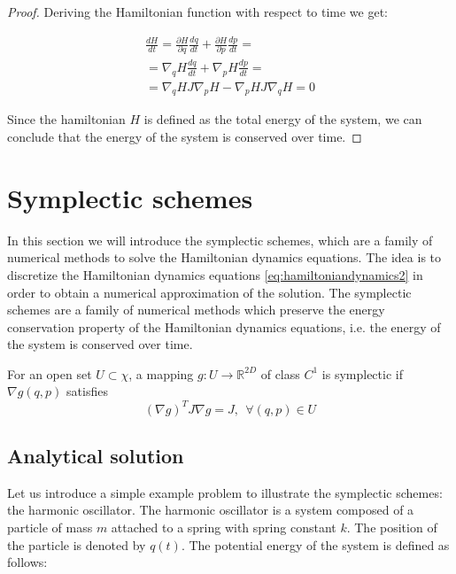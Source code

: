 \documentclass{report}
\begin{document}
\begin{proof}
	Deriving the Hamiltonian function with respect to time we get:

	\begin{gather*}
		\frac{dH}{dt} = \frac{\partial H}{\partial q} \frac{dq}{dt} + \frac{\partial H}{\partial p} \frac{dp}{dt} = \\ 
		= \nabla_q H \frac{dq}{dt} + \nabla_p H \frac{dp}{dt} = \\ 
		= \nabla_q H J \nabla_p H - \nabla_p H J \nabla_q H = 0
	\end{gather*}

	Since the hamiltonian \(H\) is defined as the total energy of the system, we can conclude that the energy of the system is conserved over time.
\end{proof}

\section{Symplectic schemes}
\label{sec:symplectic_schemes}

In this section we will introduce the symplectic schemes, which are a family of numerical methods to solve the Hamiltonian dynamics equations. The idea is to discretize the Hamiltonian dynamics equations \eqref{eq:hamiltoniandynamics2} in order to obtain a numerical approximation of the solution. The symplectic schemes are a family of numerical methods which preserve the energy conservation property of the Hamiltonian dynamics equations, i.e. the energy of the system is conserved over time.

\begin{definition}
	For an open set \(U \subset \chi \), a mapping \(g: U \rightarrow \mathbb{R}^{2D}\) of class \(C^1\) is symplectic if \(\nabla g(q,p)\) satisfies
	\[
		(\nabla g)^T J \nabla g = J, \ \ \forall (q,p) \in U
	\]
\end{definition}

\subsection{Analytical solution}
\label{sec:analytical_solution}

Let us introduce a simple example problem to illustrate the symplectic schemes: the harmonic oscillator. The harmonic oscillator is a system composed of a particle of mass \(m\) attached to a spring with spring constant \(k\). The position of the particle is denoted by \(q(t)\). The potential energy of the system is defined as follows:
\end{document}
